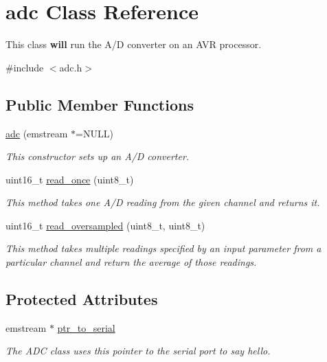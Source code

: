 \hypertarget{classadc}{\section{adc Class Reference}
\label{classadc}
}


This class {\bfseries will} run the A/\-D converter on an A\-V\-R processor.  




{\ttfamily \#include $<$adc.\-h$>$}

\subsection*{Public Member Functions}
\begin{DoxyCompactItemize}
\item 
\hyperlink{classadc_af3b8262c08f5fc5ae325a20622883424}{adc} (emstream $\ast$=N\-U\-L\-L)
\begin{DoxyCompactList}\small\item\em This constructor sets up an A/\-D converter. \end{DoxyCompactList}\item 
uint16\-\_\-t \hyperlink{classadc_a2190a59696a7093e1ea605e998ccf97e}{read\-\_\-once} (uint8\-\_\-t)
\begin{DoxyCompactList}\small\item\em This method takes one A/\-D reading from the given channel and returns it. \end{DoxyCompactList}\item 
uint16\-\_\-t \hyperlink{classadc_a58f1030fe64d3dea4ccd8a2687dd6fce}{read\-\_\-oversampled} (uint8\-\_\-t, uint8\-\_\-t)
\begin{DoxyCompactList}\small\item\em This method takes multiple readings specified by an input parameter from a particular channel and return the average of those readings. \end{DoxyCompactList}\end{DoxyCompactItemize}
\subsection*{Protected Attributes}
\begin{DoxyCompactItemize}
\item 
\hypertarget{classadc_a14680b48b723bf1adddd2741ebb18a3e}{emstream $\ast$ \hyperlink{classadc_a14680b48b723bf1adddd2741ebb18a3e}{ptr\-\_\-to\-\_\-serial}}\label{classadc_a14680b48b723bf1adddd2741ebb18a3e}

\begin{DoxyCompactList}\small\item\em The A\-D\-C class uses this pointer to the serial port to say hello. \end{DoxyCompactList}\end{DoxyCompactItemize}


